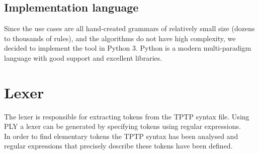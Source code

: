 \subsection{Implementation language}\label{sec:ConceptImplementationLanguage}

Since the use cases are all hand-created grammars of relatively small
size (dozens to thousands of rules), and the algorithms do not have
high complexity, we decided to implement the tool in Python 3. Python
is a modern multi-paradigm language with good support and excellent
libraries.


\section{Lexer}\label{sec:ConceptLexer}
The lexer is responsible for extracting tokens from the \ac{TPTP} syntax file. Using \ac{PLY} a lexer can be generated by specifying tokens using regular expressions.\\
In order to find elementary tokens the \ac{TPTP} syntax has been analysed and regular expressions that precisely describe these tokens have been defined.

